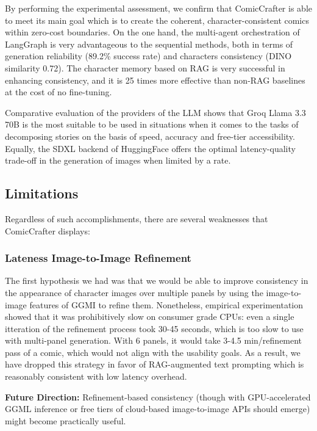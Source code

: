 \documentclass[runningheads]{llncs}
\begin{document}
By performing the experimental assessment, we confirm that ComicCrafter is able to meet its main goal which is to create the coherent, character-consistent comics within zero-cost boundaries. On the one hand, the multi-agent orchestration of LangGraph is very advantageous to the sequential methods, both in terms of generation reliability (89.2\% success rate) and characters consistency (DINO similarity 0.72). The character memory based on RAG is very successful in enhancing consistency, and it is 25 times more effective than non-RAG baselines at the cost of no fine-tuning.

Comparative evaluation of the providers of the LLM shows that Groq Llama 3.3 70B is the most suitable to be used in situations when it comes to the tasks of decomposing stories on the basis of speed, accuracy and free-tier accessibility. Equally, the SDXL backend of HuggingFace offers the optimal latency-quality trade-off in the generation of images when limited by a rate.

\subsection{Limitations}

Regardless of such accomplishments, there are several weaknesses that ComicCrafter displays:

\subsubsection{Lateness Image-to-Image Refinement}

The first hypothesis we had was that we would be able to improve consistency in the appearance of character images over multiple panels by using the image-to-image features of GGMI to refine them. Nonetheless, empirical experimentation showed that it was prohibitively slow on consumer grade CPUs: even a single itteration of the refinement process took 30-45 seconds, which is too slow to use with multi-panel generation. With 6 panels, it would take 3-4.5 min/refinement pass of a comic, which would not align with the usability goals. As a result, we have dropped this strategy in favor of RAG-augmented text prompting which is reasonably consistent with low latency overhead.

\textbf{Future Direction:} Refinement-based consistency (though with GPU-accelerated GGML inference or free tiers of cloud-based image-to-image APIs should emerge) might become practically useful.
\end{document}
